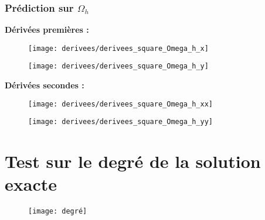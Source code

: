 \newpage

\subsubsection{Prédiction sur $\Omega_h$}

\textbf{Dérivées premières :}

\begin{figure}[H]
	\centering
	\texttt{[image: derivees/derivees\_square\_Omega\_h\_x]}
	\label{fig:deriveessquareomegahx}
\end{figure}

\begin{figure}[H]
	\centering
	\texttt{[image: derivees/derivees\_square\_Omega\_h\_y]}
	\label{fig:deriveessquareomegahy}
\end{figure}

\newpage

\textbf{Dérivées secondes :}

\begin{figure}[H]
	\centering
	\texttt{[image: derivees/derivees\_square\_Omega\_h\_xx]}
	\label{fig:deriveessquareomegahxx}
\end{figure}

\begin{figure}[H]
	\centering
	\texttt{[image: derivees/derivees\_square\_Omega\_h\_yy]}
	\label{fig:deriveessquareomegahyy}
\end{figure}

\newpage

\section{Test sur le degré de la solution exacte}

\begin{figure}[H]
	\centering
	\texttt{[image: degré]}
	\label{fig:degre}
\end{figure}